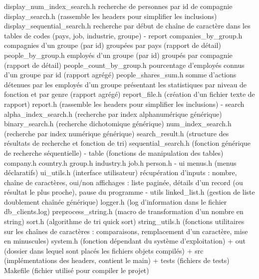 \documentclass{article}
\begin{document}
\begin{verbatimtab}
            display_num_index_search.h
                recherche de personnes par id de compagnie
            display_search.h (rassemble les headers pour simplifier les inclusions)
            display_sequential_search.h
                recherche par début de chaîne de caractère dans les tables de codes
                (pays, job, industrie, groupe)
        - report
            companies_by_group.h
                compagnies d'un groupe (par id) groupées par pays (rapport de détail)
            people_by_group.h
                employés d'un groupe (par id) groupés par compagnie (rapport de détail)
            people_count_by_group.h 
                pourcentage d'employés connus d'un groupe par id (rapport agrégé)
            people_shares_sum.h
                somme d'actions détenues par les employés d'un groupe présentant
                les statistiques par niveau de fonction et par genre (rapport agrégé)
            report_file.h (création d'un fichier texte de rapport)
            report.h (rassemble les headers pour simplifier les inclusions)
        - search
            alpha_index_search.h (recherche par index alphanumérique générique)
            binary_search.h (recherche dichotomique générique)
            num_index_search.h (recherche par index numérique générique)
            search_result.h (structure des résultats de recherche et fonction de tri)
            sequential_search.h (fonction générique de recherche séquentielle)
        - table (fonctions de manipulation des tables)
            company.h
            country.h
            group.h
            industry.h
            job.h
            person.h
        - ui
            menus.h (menus déclaratifs)
            ui_utils.h (interface utilisateur)
                récupération d'inputs : nombre, chaîne de caractères, oui/non
                affichages : liste paginée, détails d'un record (ou résultat
                    le plus proche), pause du programme
        - utils
            linked_list.h (gestion de liste doublement chaînée générique)
            logger.h (log d'information dans le fichier db_clients.log)
            preprocess_string.h (macro de transformation d'un nombre en string)
            sort.h (algorithme de tri quick sort)
            string_utils.h (fonctions utilitaires sur les chaînes de caractères :
                comparaisons, remplacement d'un caractère, mise en minuscules)
            system.h (fonction dépendant du système d'exploitation)
    + out (dossier dans lequel sont placés les fichiers objets compilés)
    + src (implémentations des headers, contient le main)
    + tests (fichiers de tests)
    Makefile (fichier utilisé pour compiler le projet)
    \end{verbatimtab}
\end{document}
